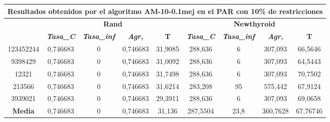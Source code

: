 \documentclass[12pt, spanish]{article}
\begin{document}
\begin{table}[H]
\footnotesize
\begin{tabular}{|c|c|c|c|c|c|c|c|c|}
\hline
\multicolumn{9}{|c|}{\textbf{Resultados obtenidos por el algoritmo AM-10-0.1mej en el PAR con 10\% de restricciones}}                                                                                             \\ \hline
\multirow{2}{*}{} & \multicolumn{4}{c|}{\textbf{Rand}}                                                            & \multicolumn{4}{c|}{\textbf{Newthyroid}}                                                      \\ \cline{2-9} 
                  & \textit{\textbf{Tasa\_C}} & \textit{\textbf{Tasa\_inf}} & \textit{\textbf{Agr,}} & \textbf{T} & \textit{\textbf{Tasa\_C}} & \textit{\textbf{Tasa\_inf}} & \textit{\textbf{Agr,}} & \textbf{T} \\ \hline
123452244         & 0,746683                  & 0                           & 0,746683               & 31,9085    & 288,636                   & 6                           & 307,093                & 66,5646    \\ \hline
9398429           & 0,746683                  & 0                           & 0,746683               & 31,0092    & 288,636                   & 6                           & 307,093                & 64,5443    \\ \hline
12321             & 0,746683                  & 0                           & 0,746683               & 31,7498    & 288,636                   & 6                           & 307,093                & 70,7502    \\ \hline
213566            & 0,746683                  & 0                           & 0,746683               & 31,6214    & 283,208                   & 95                          & 575,442                & 67,9124    \\ \hline
3939021           & 0,746683                  & 0                           & 0,746683               & 29,3911    & 288,636                   & 6                           & 307,093                & 69,0658    \\ \hline
\textbf{Media}    & 0,746683                  & 0                           & 0,746683               & 31,136     & 287,5504                  & 23,8                        & 360,7628               & 67,76746   \\ \hline
\end{tabular}
\end{table}
\end{document}
